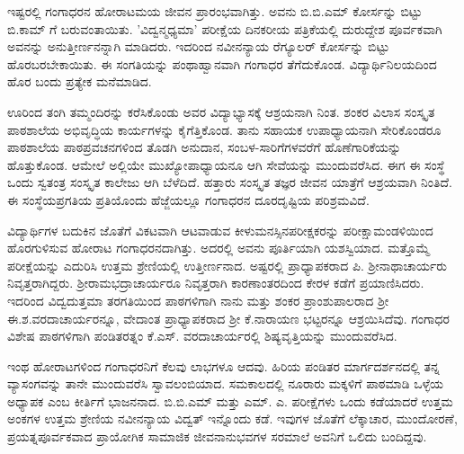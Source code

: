 {ಇಷ್ಟರಲ್ಲಿ ಗಂಗಾಧರನ ಹೋರಾಟಮಯ ಜೀವನ ಪ್ರಾರಂಭವಾಗಿತ್ತು. ಅವನು  ಬಿ.ಬಿ.ಎಮ್ ಕೋರ್ಸನ್ನು ಬಿಟ್ಟು  ಬಿ.ಕಾಮ್ ಗೆ ಬರುವಂತಾಯಿತು. 'ವಿದ್ವನ್ಮಧ್ಯಮಾ' ಪರೀಕ್ಷೆಯ  ದಿನಕರೀಯ ಪತ್ರಿಕೆಯಲ್ಲಿ ದುರುದ್ದೇಶ ಪೂರ್ವಕವಾಗಿ ಅವನನ್ನು ಅನು\-ತ್ತೀರ್ಣನನ್ನಾಗಿ ಮಾಡಿದರು. ಇದರಿಂದ ನವೀನನ್ಯಾಯ ರೆಗ್ಯೂಲರ್ ಕೋರ್ಸನ್ನು ಬಿಟ್ಟು ಹೊರಬರಬೇಕಾಯಿತು. ಈ ಸಂಗತಿಯನ್ನು ಪಂಥಾಹ್ವಾನವಾಗಿ ಗಂಗಾಧರ ತೆಗೆದುಕೊಂಡ. ವಿದ್ಯಾರ್ಥಿನಿಲಯದಿಂದ ಹೊರ ಬಂದು ಪ್ರತ್ಯೇಕ ಮನೆಮಾಡಿದ.

ಊರಿಂದ ತಂಗಿ ತಮ್ಮಂದಿರನ್ನು ಕರೆಸಿಕೊಂಡು ಅವರ ವಿದ್ಯಾಭ್ಯಾಸಕ್ಕೆ ಆಶ್ರಯನಾಗಿ ನಿಂತ. ಶಂಕರ ವಿಲಾಸ ಸಂಸ್ಕೃತ ಪಾಠಶಾಲೆಯ ಅಭಿವೃದ್ಧಿಯ ಕಾರ್ಯಗಳನ್ನು ಕೈಗೆತ್ತಿಕೊಂಡ. ತಾನು ಸಹಾಯಕ ಉಪಾಧ್ಯಾಯನಾಗಿ  ಸೇರಿಕೊಂಡರೂ ಪಾಠಶಾಲೆಯ ಪಾಠ\-ಪ್ರವಚನಗಳಿಂದ  ತೊಡಗಿ ಅನುದಾನ, ಸಂಬಳ-ಸಾರಿಗೆಗಳವರೆಗೆ ಹೊಣೆಗಾರಿಕೆಯನ್ನು ಹೊತ್ತುಕೊಂಡ. ಆಮೇಲೆ ಅಲ್ಲಿಯೇ ಮುಖ್ಯೋಪಾಧ್ಯಾಯನೂ ಆಗಿ ಸೇವೆಯನ್ನು  ಮುಂದುವರೆಸಿದ. ಈಗ ಈ ಸಂಸ್ಥೆ ಒಂದು ಸ್ವತಂತ್ರ ಸಂಸ್ಕೃತ ಕಾಲೇಜು ಆಗಿ ಬೆಳೆದಿದೆ. ಹತ್ತಾರು ಸಂಸ್ಕೃತ ತಜ್ಞರ ಜೀವನ ಯಾತ್ರೆಗೆ ಆಶ್ರಯವಾಗಿ ನಿಂತಿದೆ. ಈ ಸಂಸ್ಥೆಯ\break ಪ್ರಗತಿಯ ಪ್ರತಿಯೊಂದು ಹೆಜ್ಜೆಯಲ್ಲೂ ಗಂಗಾಧರನ ದೂರದೃಷ್ಟಿಯ ಪರಿಶ್ರಮವಿದೆ. 

ವಿದ್ಯಾರ್ಥಿಗಳ ಬದುಕಿನ ಜೊತೆಗೆ ವಿಕಟವಾಗಿ ಆಟವಾಡುವ ಕೀಳುಮನಸ್ಸಿನ\break ಪರೀಕ್ಷಕರನ್ನು  ಪರೀಕ್ಷಾಮಂಡಳಿಯಿಂದ ಹೊರಗುಳಿಸುವ ಹೋರಾಟ ಗಂಗಾಧರನ\-ದಾಗಿತ್ತು.  ಅದರಲ್ಲಿ ಅವನು ಪೂರ್ತಿಯಾಗಿ ಯಶಸ್ವಿಯಾದ. ಮತ್ತೊಮ್ಮೆ ಪರೀಕ್ಷೆಯನ್ನು  ಎದುರಿಸಿ ಉತ್ತಮ ಶ್ರೇಣಿಯಲ್ಲಿ ಉತ್ತೀರ್ಣನಾದ. ಅಷ್ಟರಲ್ಲಿ ಪ್ರಾಧ್ಯಾಪಕ\-ರಾದ ಪಿ. ಶ್ರೀನಾಥಾಚಾರ್ಯರು ನಿವೃತ್ತರಾಗಿದ್ದರು. \-ಶ್ರೀರಾಮಭದ್ರಾಚಾರ್ಯರೂ ನಿವೃತ್ತ\-ರಾಗಿ  ಕಾರಣಾಂತರದಿಂದ ಕೇರಳ ಕಡೆಗೆ ಪ್ರಯಾಣಿಸಿದರು. ಇದರಿಂದ \-ವಿದ್ವದುತ್ತಮಾ ತರಗತಿಯಿಂದ ಪಾಠಗಳಿಗಾಗಿ ನಾನು ಮತ್ತು ಶಂಕರ ಪ್ರಾಂಶುಪಾಲರಾದ ಶ್ರೀ ಈ.ಶ.ವರದಾಚಾರ್ಯರನ್ನೂ, ವೇದಾಂತ ಪ್ರಾಧ್ಯಾಪಕರಾದ ಶ್ರೀ ಕೆ.ನಾರಾಯಣ ಭಟ್ಟರನ್ನೂ ಆಶ್ರಯಿಸಿದೆವು. ಗಂಗಾಧರ ವಿಶೇಷ ಪಾಠಗಳಿಗಾಗಿ ಪಂಡಿತರತ್ನಂ ಕೆ.ಎಸ್. ವರದಾ\-ಚಾರ್ಯರಲ್ಲಿ ಶಿಷ್ಯವೃತ್ತಿಯನ್ನು ಮುಂದುವರೆಸಿದ. 

ಇಂಥ ಹೋರಾಟಗಳಿಂದ ಗಂಗಾಧರನಿಗೆ ಕೆಲವು ಲಾಭಗಳೂ ಆದವು. ಹಿರಿಯ ಪಂಡಿತರ ಮಾರ್ಗದರ್ಶನದಲ್ಲಿ ತನ್ನ ವ್ಯಾಸಂಗವನ್ನು ತಾನೇ ಮುಂದುವರೆಸಿ ಸ್ವಾವಲಂಬಿ\-ಯಾದ. ಸಮಕಾಲದಲ್ಲಿ ನೂರಾರು ಮಕ್ಕಳಿಗೆ ಪಾಠಮಾಡಿ ಒಳ್ಳೆಯ ಅಧ್ಯಾಪಕ ಎಂಬ ಕೀರ್ತಿಗೆ ಭಾಜನನಾದ. ಬಿ.ಬಿ.ಎಮ್ ಮತ್ತು ಎಮ್. ಎ. ಪರೀಕ್ಷೆಗಳು ಒಂದು ಕಡೆಯಾದರೆ ಉತ್ತಮ ಅಂಕಗಳ ಉತ್ತಮ ಶ್ರೇಣಿಯ ನವೀನನ್ಯಾಯ ವಿದ್ವತ್ ಇನ್ನೊಂದು ಕಡೆ. ಇವುಗಳ ಜೊತೆಗೆ ಲೆಕ್ಕಾಚಾರ, ಮುಂದೋರಣೆ, ಪ್ರಯತ್ನಪೂರ್ವಕವಾದ ಪ್ರಾಯೋಗಿಕ ಸಾಮಾಜಿಕ   ಜೀವನಾನುಭವಗಳ ಸರಮಾಲೆ ಅವನಿಗೆ ಒಲಿದು ಬಂದಿದ್ದವು. 

}
